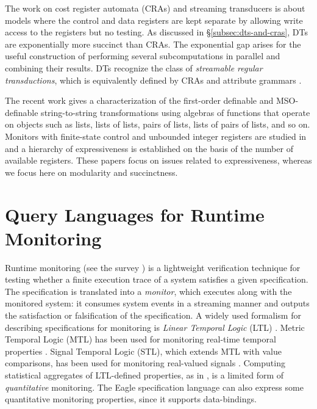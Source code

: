 The work on cost register automata (CRAs) \cite{AdADRY2013CRA, AR2013ARF} and streaming transducers \cite{AC2010SST, AC2011STA, AdA2012STT} is about models where the control and data registers are kept separate by allowing write access to the registers but no testing. As discussed in \S\ref{subsec:dts-and-cras}, DTs are exponentially more succinct than CRAs. The exponential gap arises for the useful construction of performing several subcomputations in parallel and combining their results. DTs recognize the class of \emph{streamable regular transductions}, which
is equivalently defined by CRAs and attribute grammars \cite{arXiv2018}.

The recent work \cite{BDK2018} gives a characterization of the first-order definable and MSO-definable string-to-string transformations using algebras of functions that operate on objects such as lists, lists of lists, pairs of lists, lists of pairs of lists, and so on. Monitors with finite-state control and unbounded integer registers are studied in \cite{FHS2018} and a hierarchy of expressiveness is established on the basis of the number of available registers. These papers focus on issues related to expressiveness, whereas we focus here on modularity and succinctness.

\section{Query Languages for Runtime Monitoring}

Runtime monitoring (see the survey \cite{LS2009RV}) is a lightweight verification technique for testing whether a finite execution trace of a system satisfies a given specification. The specification is translated into a \emph{monitor}, which executes along with the monitored system: it consumes system events in a streaming manner and outputs the satisfaction or falsification of the specification. A widely used formalism for describing specifications for monitoring is \emph{Linear Temporal Logic} (LTL) \cite{havelund2004efficient}. Metric Temporal Logic (MTL) has been used for monitoring real-time temporal properties \cite{TR2005MTL}. Signal Temporal Logic (STL), which extends MTL with value comparisons, has been used for monitoring real-valued signals \cite{DDGJJS2017}.
Computing statistical aggregates of LTL-defined properties, as in \cite{finkbeiner2002collecting}, is a limited form of \emph{quantitative} monitoring.
The Eagle specification language \cite{barringer2004rule} can also express some quantitative monitoring properties, since it supports data-bindings.

